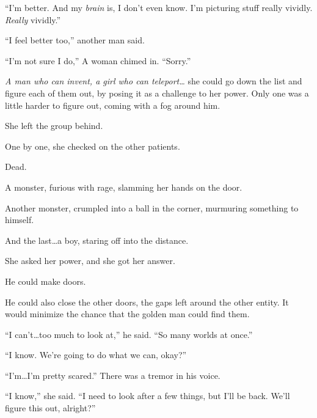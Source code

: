 ``I'm better.  And my \emph{brain} is, I don't even know.  I'm picturing stuff really vividly.  \emph{Really} vividly.''



``I feel better too,'' another man said.



``I'm not sure I do,'' A woman chimed in.  ``Sorry.''



\emph{A man who can invent, a girl who can teleport\ldots}  she could go down the list and figure each of them out, by posing it as a challenge to her power.  Only one was a little harder to figure out, coming with a fog around him.



She left the group behind.



One by one, she checked on the other patients.



Dead.



A monster, furious with rage, slamming her hands on the door.



Another monster, crumpled into a ball in the corner, murmuring something to himself.



And the last\ldots a boy, staring off into the distance.



She asked her power, and she got her answer.



He could make doors.



He could also close the other doors, the gaps left around the other entity.  It would minimize the chance that the golden man could find them.



``I can't\ldots too much to look at,'' he said.  ``So many worlds at once.''



``I know.  We're going to do what we can, okay?''



``I'm\ldots I'm pretty scared.''  There was a tremor in his voice.



``I know,'' she said.  ``I need to look after a few things, but I'll be back.  We'll figure this out, alright?''




